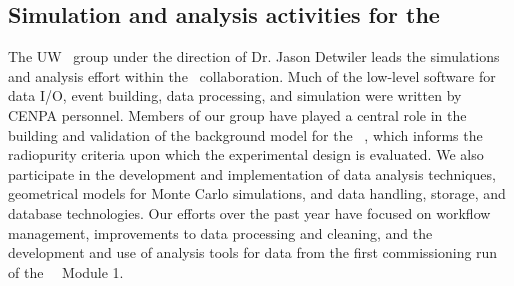 \subsection {Simulation and analysis activities for the \MJ\ \MJDemo \label{MJDSimArticle}}


\noindent The UW \MJ\ group under the direction of Dr. Jason Detwiler leads the simulations and analysis effort within the \MJ\ collaboration. Much of the low-level software for data I/O, event building, data processing, and simulation were written by CENPA personnel. Members of our group have played a central role in the building and validation of the background model for the \MJ\ \MJDemo, which informs the radiopurity criteria upon which the experimental design is evaluated. We also participate in the development and implementation of data analysis techniques, geometrical models for Monte Carlo simulations, and data handling, storage, and database technologies. Our efforts over the past year have focused on workflow management, improvements to data processing and cleaning, and the development and use of analysis tools for data from the first commissioning run of the \MJ\ \MJDemo\ Module 1.

